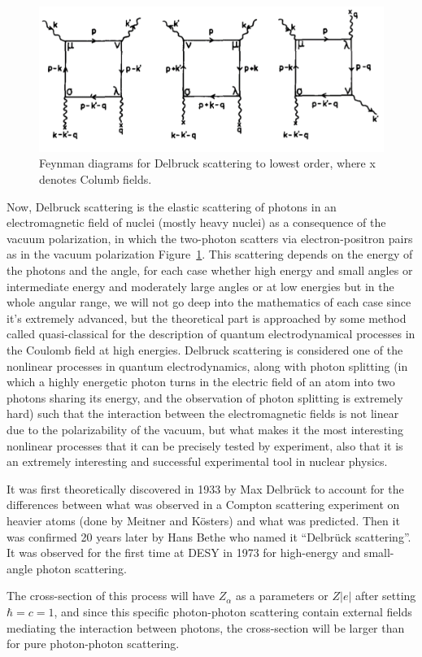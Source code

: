 \documentclass{article}
\begin{document}
\begin{figure}[!th]
	\centering
	\includegraphics[width=0.5\linewidth]{figures/fyenman-diagram-Delbruck.png}
	\caption{Feynman diagrams for Delbruck scattering to lowest order, where x denotes Columb fields.}
	\label{fig:Feynman-Delbruck}
\end{figure}
Now, Delbruck scattering is the elastic scattering of photons in an electromagnetic field of nuclei (mostly heavy nuclei) as a consequence of the vacuum polarization, in which the two-photon scatters via electron-positron pairs as in the vacuum polarization Figure~\ref{fig:Feynman-Delbruck}.
This scattering depends on the energy of the photons and the angle, for each case whether high energy and small angles or intermediate energy and moderately large angles or at low energies but in the whole angular range, we will not go deep into the mathematics of each case since it’s extremely advanced, but the theoretical part is approached by some method called quasi-classical for the description of quantum electrodynamical processes in the Coulomb field at high energies.
Delbruck scattering is considered one of the nonlinear processes in quantum electrodynamics, along with photon splitting (in which a highly energetic photon turns in the electric field of an atom into two photons sharing its energy, and the observation of photon splitting is extremely hard) such that the interaction between the electromagnetic fields is not linear due to the polarizability of the vacuum, but what makes it the most interesting nonlinear processes that it can be precisely tested by experiment, also that it is an extremely interesting and successful experimental tool in nuclear physics.

It was first theoretically discovered in 1933 by Max Delbrück to account for the differences between what was observed in a Compton scattering experiment on heavier atoms (done by Meitner and Kösters) and what was predicted. Then it was confirmed 20 years later by Hans Bethe who named it “Delbrück scattering”. It was observed for the first time at DESY in 1973 for high-energy and small-angle photon scattering.

The cross-section of this process will have $Z_\alpha$ as a parameters or $Z|e|$ after setting $\hbar=c=1$, and since this specific photon-photon scattering contain external fields mediating the interaction between photons, the cross-section will be larger than for pure photon-photon scattering.
\end{document}

